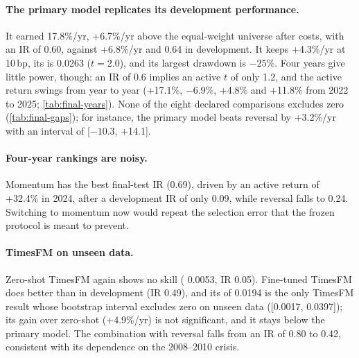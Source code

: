 \paragraph{The primary model replicates its development performance.}
It earned 17.8\%/yr, +6.7\%/yr above the equal-weight universe after costs, with an IR of 0.60, against +6.8\%/yr and 0.64 in development.
It keeps +4.3\%/yr at 10\,bp, its \ric{} is 0.0263 ($t=2.0$), and its largest drawdown is $-25\%$.
Four years give little power, though: an IR of 0.6 implies an active $t$ of only 1.2, and the active return swings from year to year (+17.1\%, $-6.9$\%, +4.8\% and +11.8\% from 2022 to 2025; \cref{tab:final-years}).
None of the eight declared comparisons excludes zero (\cref{tab:final-gaps}); for instance, the primary model beats reversal by +3.2\%/yr with an interval of [$-10.3$, +14.1].

\paragraph{Four-year rankings are noisy.}
Momentum has the best final-test IR (0.69), driven by an active return of +32.4\% in 2024, after a development IR of only 0.09, while reversal falls to 0.24.
Switching to momentum now would repeat the selection error that the frozen protocol is meant to prevent.

\paragraph{TimesFM on unseen data.}
Zero-shot TimesFM again shows no skill (\ric{} 0.0053, IR 0.05).
Fine-tuned TimesFM does better than in development (IR 0.49), and its \ric{} of 0.0194 is the only TimesFM result whose bootstrap interval excludes zero on unseen data ([0.0017, 0.0397]); its gain over zero-shot (+4.9\%/yr) is not significant, and it stays below the primary model.
The combination with reversal falls from an IR of 0.80 to 0.42, consistent with its dependence on the 2008--2010 crisis.
